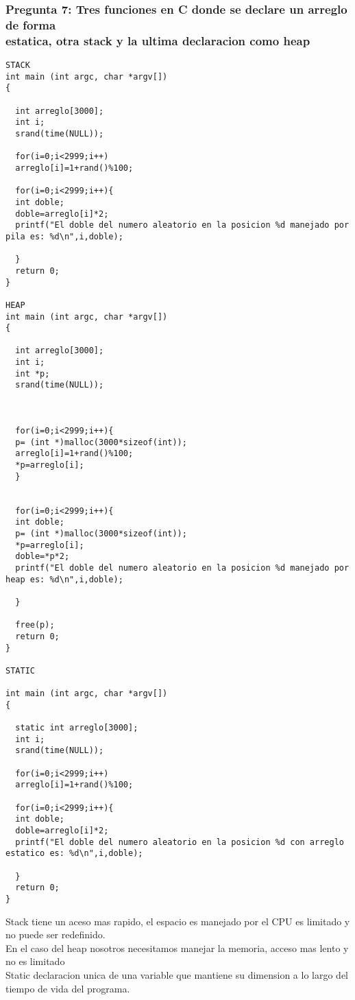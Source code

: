 \subsubsection{Pregunta 7: Tres funciones en C donde se declare un arreglo de forma\\
estatica, otra stack y la ultima declaracion como heap}

\begin{verbatim}
STACK 
int main (int argc, char *argv[])
{
 
  int arreglo[3000];
  int i;
  srand(time(NULL));

  for(i=0;i<2999;i++)
  arreglo[i]=1+rand()%100;

  for(i=0;i<2999;i++){
  int doble;
  doble=arreglo[i]*2;
  printf("El doble del numero aleatorio en la posicion %d manejado por pila es: %d\n",i,doble);
 
  }
  return 0;
}

HEAP
int main (int argc, char *argv[])
{
 
  int arreglo[3000]; 
  int i;
  int *p;
  srand(time(NULL));
  


  for(i=0;i<2999;i++){
  p= (int *)malloc(3000*sizeof(int));
  arreglo[i]=1+rand()%100;
  *p=arreglo[i];
  }
 

  for(i=0;i<2999;i++){
  int doble;
  p= (int *)malloc(3000*sizeof(int));
  *p=arreglo[i];
  doble=*p*2;
  printf("El doble del numero aleatorio en la posicion %d manejado por heap es: %d\n",i,doble);
  
  }

  free(p);
  return 0;
}

STATIC

int main (int argc, char *argv[])
{
 
  static int arreglo[3000];
  int i;
  srand(time(NULL));

  for(i=0;i<2999;i++)
  arreglo[i]=1+rand()%100;

  for(i=0;i<2999;i++){
  int doble;
  doble=arreglo[i]*2;
  printf("El doble del numero aleatorio en la posicion %d con arreglo estatico es: %d\n",i,doble);
 
  }
  return 0;
}

\end{verbatim}
Stack tiene un aceso mas rapido, el espacio es manejado por el CPU es limitado y no puede ser redefinido.\\
En el caso del heap nosotros necesitamos manejar la memoria, acceso mas lento y no es limitado\\
Static declaracion unica de una variable que mantiene su dimension a lo largo del tiempo de vida del programa.

